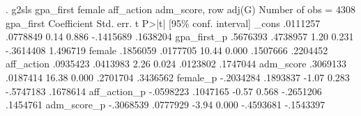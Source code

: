 . g2sls gpa_first female aff_action adm_score, row adj(G)
{\smallskip}
                                                  Number of obs =       4308
   gpa_first {\VBAR} Coefficient  Std. err.      t    P>|t|     [95\% conf. interval]
       _cons {\VBAR}   .0111257   .0778849     0.14   0.886    -.1415689    .1638204
 gpa_first_p {\VBAR}   .5676393   .4738957     1.20   0.231    -.3614408    1.496719
      female {\VBAR}   .1856059   .0177705    10.44   0.000     .1507666    .2204452
  aff_action {\VBAR}   .0935423   .0413983     2.26   0.024     .0123802    .1747044
   adm_score {\VBAR}   .3069133   .0187414    16.38   0.000     .2701704    .3436562
    female_p {\VBAR}  -.2034284   .1893837    -1.07   0.283    -.5747183    .1678614
aff_action_p {\VBAR}  -.0598223   .1047165    -0.57   0.568    -.2651206    .1454761
 adm_score_p {\VBAR}  -.3068539   .0777929    -3.94   0.000    -.4593681   -.1543397
